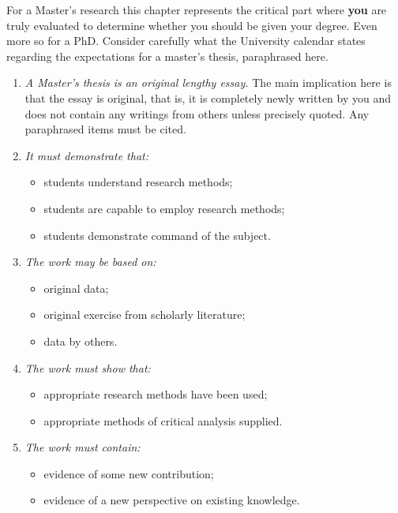 \label{chapter:eval}

For a Master's research this chapter represents the critical part where \textbf{you} are truly evaluated to determine whether you should be given your degree. Even more so for a PhD. Consider carefully what the University calendar states regarding the expectations for a master's thesis, paraphrased here.

\begin{enumerate}
\item {\textit{A Master's thesis is an original lengthy essay.} The main implication here is that the essay is original, that is, it is completely newly written by you and does not contain any writings from others unless precisely quoted. Any paraphrased items must be cited.}
\item {\textit{It must demonstrate that:}
    \begin{itemize}
    \item {students understand research methods;}
    \item {students are capable to employ research methods;}
    \item {students demonstrate command of the subject.}
    \end{itemize}}
\item {\textit{The work may be based on:}
    \begin{itemize}
    \item {original data;}
    \item {original exercise from scholarly literature;}
    \item {data by others.}
    \end{itemize}}
\item {\textit{The work must show that:}
    \begin{itemize}
    \item {appropriate research methods have been used;}
    \item {appropriate methods of critical analysis supplied.}
    \end{itemize}}
\item {\textit{The work must contain:}
    \begin{itemize}
    \item {evidence of some new contribution;}
    \item {evidence of a new perspective on existing knowledge.}
    \end{itemize}}
\end{enumerate}

